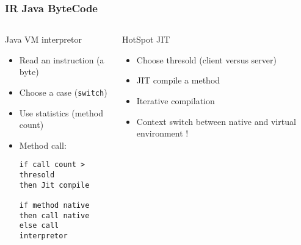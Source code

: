 %
\begin{frame}[fragile]\frametitle{IR Java ByteCode}
  \begin{columns}[t]
    \begin{column}{\BW} %
      \begin{block}{Java VM interpretor}
        \begin{itemize}
        \item Read an instruction (a byte)
        \item Choose a case (\texttt{switch})
        \item Use statistics (method count)
        \item Method call:
\begin{verbatim}
if call count > thresold 
then Jit compile

if method native
then call native
else call interpretor
\end{verbatim}
        \end{itemize}
      \end{block} 
    \end{column}
    
    \begin{column}{\BW} %
      \begin{block}{HotSpot JIT}
        \begin{itemize}
        \item Choose thresold (client versus server)\TBD
        \item JIT compile a method
        \item Iterative compilation
        \item Context switch between native and virtual environment !
        \end{itemize}
      \end{block}   
    \end{column}
  \end{columns}  
\end{frame}


